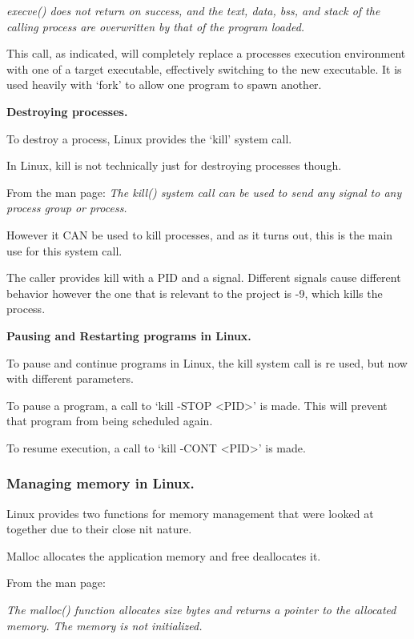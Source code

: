 \documentclass[a4paper]{report}
\begin{document}
\textit {execve() does not return on success, and the  text,  data,  bss,  and stack  of  the calling process are overwritten by that of the program loaded.} \cite{manExecve}

This call, as indicated, will completely replace a processes execution environment with one of a target executable, effectively switching to the new executable. It is used heavily with `fork' to allow one program to spawn another.

\textbf{Destroying processes.}

To destroy a process, Linux provides the `kill' system call.

In Linux, kill is not technically just for destroying processes though.

From the man page:
\textit{The kill() system call can be used to send any signal to any process group or process.}\cite{manKill}

However it CAN be used to kill processes, and as it turns out, this is the main use for this system call.

The caller provides kill with a PID and a signal. Different signals cause different behavior however the one that is relevant to the project is -9, which kills the process.


\textbf{Pausing and Restarting programs in Linux.}

To pause and continue programs in Linux, the kill system call is re used, but now with different parameters.

To pause a program, a call to `kill -STOP \textless PID\textgreater' is made. This will prevent that program from being scheduled again.

To resume execution, a call to `kill -CONT \textless PID\textgreater' is made.



\subsubsection*{Managing memory in Linux.}

Linux provides two functions for memory management that were looked at together due to their close nit nature.

Malloc allocates the application memory and free deallocates it.

From the man page:

\textit{The malloc() function allocates size bytes and returns a pointer to the allocated memory.  The memory is not initialized.}
\end{document}
